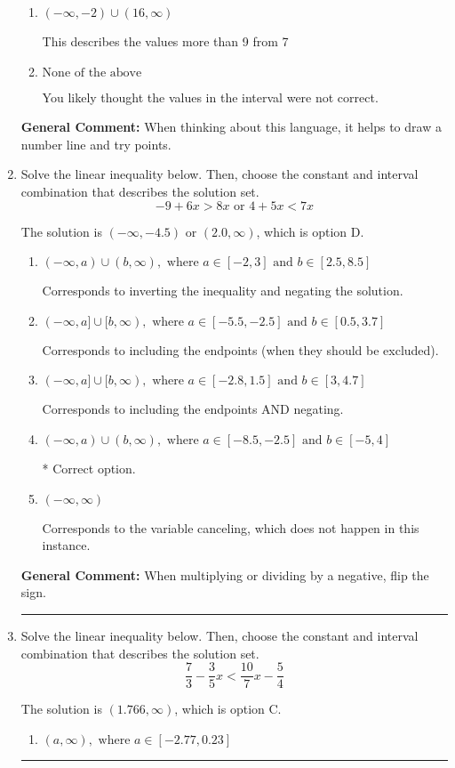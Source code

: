 \documentclass{extbook}[14pt]
\newcommand{\litem}[1]{\item #1

\rule{\textwidth}{0.4pt}}
\begin{document}
\begin{enumerate}
{\begin{enumerate}[label=\Alph*.]
This describes the values no more than 9 from 7
\item \( (-\infty, -2) \cup (16, \infty) \)

This describes the values more than 9 from 7
\item \( \text{None of the above} \)

You likely thought the values in the interval were not correct.
\end{enumerate}

\textbf{General Comment:} When thinking about this language, it helps to draw a number line and try points.
}
\litem{
Solve the linear inequality below. Then, choose the constant and interval combination that describes the solution set.
\[ -9 + 6 x > 8 x \text{ or } 4 + 5 x < 7 x \]

The solution is \( (-\infty, -4.5) \text{ or } (2.0, \infty) \), which is option D.\begin{enumerate}[label=\Alph*.]
\item \( (-\infty, a) \cup (b, \infty), \text{ where } a \in [-2, 3] \text{ and } b \in [2.5, 8.5] \)

Corresponds to inverting the inequality and negating the solution.
\item \( (-\infty, a] \cup [b, \infty), \text{ where } a \in [-5.5, -2.5] \text{ and } b \in [0.5, 3.7] \)

Corresponds to including the endpoints (when they should be excluded).
\item \( (-\infty, a] \cup [b, \infty), \text{ where } a \in [-2.8, 1.5] \text{ and } b \in [3, 4.7] \)

Corresponds to including the endpoints AND negating.
\item \( (-\infty, a) \cup (b, \infty), \text{ where } a \in [-8.5, -2.5] \text{ and } b \in [-5, 4] \)

 * Correct option.
\item \( (-\infty, \infty) \)

Corresponds to the variable canceling, which does not happen in this instance.
\end{enumerate}

\textbf{General Comment:} When multiplying or dividing by a negative, flip the sign.
}
\litem{
Solve the linear inequality below. Then, choose the constant and interval combination that describes the solution set.
\[ \frac{7}{3} - \frac{3}{5} x < \frac{10}{7} x - \frac{5}{4} \]

The solution is \( (1.766, \infty) \), which is option C.\begin{enumerate}[label=\Alph*.]
\item \( (a, \infty), \text{ where } a \in [-2.77, 0.23] \)


\end{enumerate}}
\end{enumerate}
\end{document}
